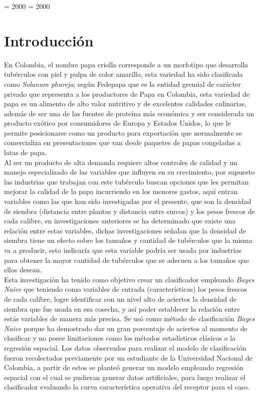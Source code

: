 
\righthyphenmin = 2000
\lefthyphenmin = 2000

\chapter*{Introducci\'on}

En Colombia, el nombre papa criolla corresponde a un morfotipo que desarrolla tubérculos
con piel y pulpa de color amarillo, esta variedad ha sido clasificada como
\textit{Solanum phureja}; según Fedepapa que es la entidad gremial de carácter privado que
representa a los productores de Papa en Colombia, esta variedad de papa es un alimento de
alto valor nutritivo y de excelentes calidades culinarias, además de ser una de las fuentes
de proteína más económica y ser considerada un producto exótico por consumidores de Europa
 y Estados Unidos, lo que le permite posicionarse como un producto para exportación que
 normalmente se comercializa en presentaciones que van desde paquetes de papas congeladas
  a latas de papa.\\

Al ser un producto de alta demanda requiere altos controles de calidad  y un  manejo
especializado de las variables que influyen en su crecimiento, por supuesto las industrias
que trabajan con este tubérculo buscan opciones que les permitan mejorar la calidad de la
papa incurriendo en los menores gastos, aquí entran variables como las que han sido
investigadas por el presente, que son la densidad de siembra (distancia entre plantas
y distancia entre surcos) y los pesos frescos de cada calibre, en investigaciones
anteriores se ha determinado que existe una relación entre estas variables, dichas
investigaciones señalan que la densidad de siembra tiene un efecto sobre los tamaños y
cantidad de tubérculos que la misma va a producir, esto indicaría que esta variable
podría ser usada por industrias para obtener la mayor cantidad de tubérculos que se
adecuen a los tamaños que ellos desean. \\

Esta investigación ha tenido como objetivo crear un clasificador empleando \textit{Bayes Naive}
 que teniendo como variables de entrada (características) los pesos frescos de cada
 calibre, logre identificar con un nivel alto de aciertos la densidad de siembra que
 fue usada en esa cosecha, y así poder establecer la relación entre estás variables
 de manera más precisa. Se usó como método de clasificación \textit{Bayes Naive}
 porque ha demostrado dar un gran porcentaje de aciertos al momento de clasificar y no
 posee limitaciones como los métodos estadísticos clásicos o la regresión espacial.
 Los datos observados para realizar el modelo de clasificación fueron recolectados
 previamente por un estudiante de la Universidad Nacional de Colombia, a partir de
 estos se planteó generar un modelo empleando regresión espacial con el cual se pudieran
 generar datos artificiales, para luego realizar el clasificador evaluando la curva
 característica operativa del receptor para el caso.\\

